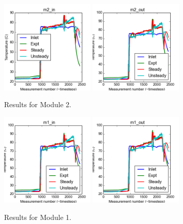 \documentclass{article}
\begin{document}
\clearpage
\begin{figure}[!ht]
\centering
\includegraphics[width=0.4\textwidth]{../../data/ICSolar/images/Mar09_m2_in_compare.png}\hspace{0.05\textwidth}
\includegraphics[width=0.4\textwidth]{../../data/ICSolar/images/Mar09_m2_out_compare.png}\hspace{0.05\textwidth}\\
\caption{Results for Module 2.}\end{figure}
\begin{figure}[!ht]
\centering
\includegraphics[width=0.4\textwidth]{../../data/ICSolar/images/Mar09_m1_in_compare.png}\hspace{0.05\textwidth}
\includegraphics[width=0.4\textwidth]{../../data/ICSolar/images/Mar09_m1_out_compare.png}\hspace{0.05\textwidth}\\
\caption{Results for Module 1.}\end{figure}
\end{document}
